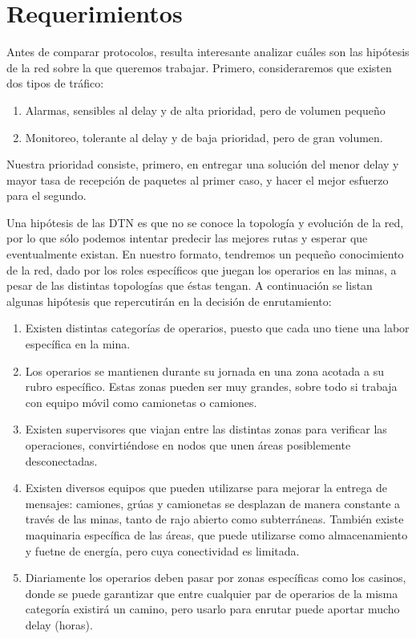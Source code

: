 \part*{Requerimientos}
Antes de comparar protocolos, resulta interesante analizar cuáles son las hipótesis de la red sobre la que queremos trabajar.
Primero, consideraremos que existen dos tipos de tráfico:

\begin{enumerate}
    \item Alarmas, sensibles al delay y de alta prioridad, pero de volumen pequeño
    \item Monitoreo, tolerante al delay y de baja prioridad, pero de gran volumen.
\end{enumerate}

Nuestra prioridad consiste, primero, en entregar una solución del menor delay y mayor tasa de recepción de paquetes al primer caso, y hacer el mejor esfuerzo para el segundo. 

Una hipótesis de las DTN es que no se conoce la topología y evolución de la red, por lo que sólo podemos intentar predecir las mejores rutas y esperar que eventualmente existan. En nuestro formato, tendremos un pequeño conocimiento de la red, dado por los roles específicos que juegan los operarios en las minas, a pesar de las distintas topologías que éstas tengan. A continuación se listan algunas hipótesis que repercutirán en la decisión de enrutamiento:

\begin{enumerate}
    \item Existen distintas categorías de operarios, puesto que cada uno tiene una labor específica en la mina.
    \item Los operarios se mantienen durante su jornada en una zona acotada a su rubro específico. Estas zonas pueden ser muy grandes, sobre todo si trabaja con equipo móvil como camionetas o camiones.
    \item Existen supervisores que viajan entre las distintas zonas para verificar las operaciones, convirtiéndose en nodos que unen áreas posiblemente desconectadas.
    \item Existen diversos equipos que pueden utilizarse para mejorar la entrega de mensajes: camiones, grúas y camionetas se desplazan de manera constante a través de las minas, tanto de rajo abierto como subterráneas. También existe maquinaria específica de las áreas, que puede utilizarse como almacenamiento y fuetne de energía, pero cuya conectividad es limitada. 
    \item Diariamente los operarios deben pasar por zonas específicas como los casinos, donde se puede garantizar que entre cualquier par de operarios de la misma categoría existirá un camino, pero usarlo para enrutar puede aportar mucho delay (horas).
\end{enumerate}

